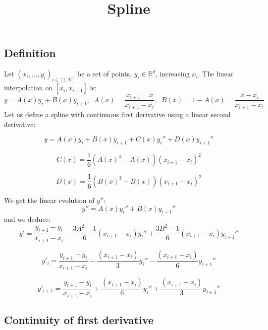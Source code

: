 \documentclass[aps,onecolumn,11pt]{revtex4}
\begin{document}
\title{Spline}
\maketitle

\subsection{Definition}
Let $(x_i,\ldots,y_i)_{i\in[1:N]}$ be a set of points, $y_i\in\mathbb{R}^d$, increasing $x_i$.
The linear interpolation on $[x_i,x_{i+1}]$ is:
\begin{equation}
	y = A(x) y_i + B(x) y_{i+1},\;\;A(x) = \dfrac{x_{i+1}-x}{x_{i+1}-x_{i}}, \;\; B(x)=1-A(x) = \dfrac{x-x_i}{x_{i+1}-x_{i}}
\end{equation}
Let us define a spline with continuous first derivative using a linear second derivative:

\begin{equation}
 	y = A(x) y_i + B(x) y_{i+1} + C(x) y_i'' + D(x) y_{i+1}''
\end{equation}

\begin{equation}
	C(x) = \dfrac{1}{6}(A(x)^3 - A(x))(x_{i+1} - x_i)^2  
\end{equation}

\begin{equation}
	D(x) = \dfrac{1}{6}(B(x)^3 - B(x))(x_{i+1} - x_i)^2  
\end{equation}

We get the linear evolution of $y''$:
\begin{equation}
	y'' = A(x) y_i'' + B(x) y_{i+1}''
\end{equation}
and we deduce:
\begin{equation}
	y' = \dfrac{y_{i+1}-y_{i}}{x_{i+1}-x_{i}} - \dfrac{3A^2-1}{6}(x_{i+1} - x_i) y_i''+ \dfrac{3B^2-1}{6}(x_{i+1} - x_i) y_{i+1}''
\end{equation}

\begin{equation}
	y'_i = \dfrac{y_{i+1}-y_{i}}{x_{i+1}-x_{i}} - \dfrac{(x_{i+1} - x_i)}{3} y_i'' - \dfrac{(x_{i+1} - x_i)}{6} y_{i+1}''
\end{equation}

\begin{equation}
	y'_{i+1} = \dfrac{y_{i+1}-y_{i}}{x_{i+1}-x_{i}} + \dfrac{(x_{i+1} - x_i)}{6} y_i'' + \dfrac{(x_{i+1} - x_i)}{3} y_{i+1}''
\end{equation}

\subsection{Continuity of first derivative}
\end{document}
